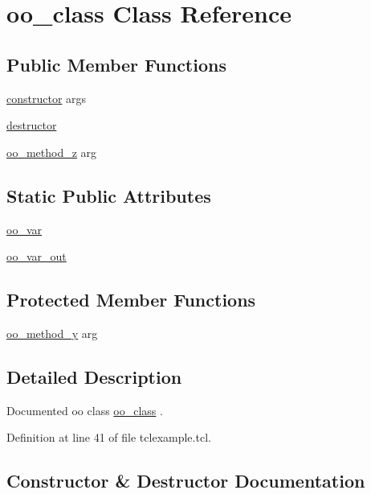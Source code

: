 \hypertarget{classns_1_1oo__class}{}\section{oo\+\_\+class Class Reference}
\label{classns_1_1oo__class}
\subsection*{Public Member Functions}
\begin{DoxyCompactItemize}
\item 
\hyperlink{classns_1_1oo__class_a774a51943bf6609f7582ee38c55a13f0}{constructor} args
\item 
\hyperlink{classns_1_1oo__class_aa04747d49a3a74e75fcfdaf017a73877}{destructor}
\item 
\hyperlink{classns_1_1oo__class_aa4571e8afadc9c5c0d0f45a5ffa4cecb}{oo\+\_\+method\+\_\+z} arg
\end{DoxyCompactItemize}
\subsection*{Static Public Attributes}
\begin{DoxyCompactItemize}
\item 
\hyperlink{classns_1_1oo__class_a0db9c0f77e13b0938595c27ae93fc47d}{oo\+\_\+var}
\item 
\hyperlink{classns_1_1oo__class_ab81ae08f4b693af6731d12ee2827971b}{oo\+\_\+var\+\_\+out}
\end{DoxyCompactItemize}
\subsection*{Protected Member Functions}
\begin{DoxyCompactItemize}
\item 
\hyperlink{classns_1_1oo__class_a93b2189732a4ddb6583f19c1a4406e10}{oo\+\_\+method\+\_\+y} arg
\end{DoxyCompactItemize}


\subsection{Detailed Description}
Documented oo class {\ttfamily \hyperlink{classns_1_1oo__class}{oo\+\_\+class}} . 

Definition at line 41 of file tclexample.\+tcl.



\subsection{Constructor \& Destructor Documentation}
\mbox{\label{classns_1_1oo__class_a774a51943bf6609f7582ee38c55a13f0}} 
